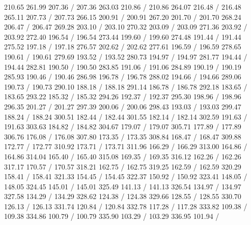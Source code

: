 { 210.65 261.99 207.36 /
 207.36 263.03 210.86 /
 210.86 264.07 216.48 /
 216.48 265.11 207.73 /
 207.73 266.15 200.91 /
 200.91 267.20 201.70 /
 201.70 268.24 206.47 /
 206.47 269.28 203.10 /
 203.10 270.32 203.09 /
 203.09 271.36 203.92 /
 203.92 272.40 196.54 /
 196.54 273.44 199.60 /
 199.60 274.48 191.44 /
 191.44 275.52 197.18 /
 197.18 276.57 202.62 /
 202.62 277.61 196.59 /
 196.59 278.65 190.61 /
 190.61 279.69 193.52 /
 193.52 280.73 194.97 /
 194.97 281.77 194.44 /
 194.44 282.81 190.50 /
 190.50 283.85 191.06 /
 191.06 284.89 190.19 /
 190.19 285.93 190.46 /
 190.46 286.98 196.78 /
 196.78 288.02 194.66 /
 194.66 289.06 190.73 /
 190.73 290.10 188.18 /
 188.18 291.14 186.78 /
 186.78 292.18 183.65 /
 183.65 293.22 185.32 /
 185.32 294.26 192.37 /
 192.37 295.30 198.96 /
 198.96 296.35 201.27 /
 201.27 297.39 200.06 /
 200.06 298.43 193.03 /
 193.03 299.47 188.24 /
 188.24 300.51 182.44 /
 182.44 301.55 182.14 /
 182.14 302.59 191.63 /
 191.63 303.63 184.82 /
 184.82 304.67 179.07 /
 179.07 305.71 177.89 /
 177.89 306.76 176.08 /
 176.08 307.80 173.35 /
 173.35 308.84 168.47 /
 168.47 309.88 172.77 /
 172.77 310.92 173.71 /
 173.71 311.96 166.29 /
 166.29 313.00 164.86 /
 164.86 314.04 165.40 /
 165.40 315.08 169.35 /
 169.35 316.12 162.26 /
 162.26 317.17 170.57 /
 170.57 318.21 162.75 /
 162.75 319.25 162.59 /
 162.59 320.29 158.41 /
 158.41 321.33 154.45 /
 154.45 322.37 150.92 /
 150.92 323.41 148.05 /
 148.05 324.45 145.01 /
 145.01 325.49 141.13 /
 141.13 326.54 134.97 /
 134.97 327.58 134.29 /
 134.29 328.62 124.38 /
 124.38 329.66 128.55 /
 128.55 330.70 126.13 /
 126.13 331.74 120.84 /
 120.84 332.78 117.28 /
 117.28 333.82 109.38 /
 109.38 334.86 100.79 /
 100.79 335.90 103.29 /
 103.29 336.95 101.94 /
}
